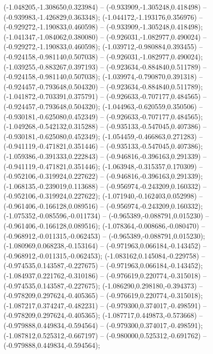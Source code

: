  (-1.048205,-1.308650,0.323984) -- (-0.933909,-1.305248,0.418498) -- (-0.939983,-1.426829,0.363348);
 (-1.044172,-1.193176,0.356976) -- (-0.929272,-1.190833,0.460598) -- (-0.933909,-1.305248,0.418498);
 (-1.041347,-1.084062,0.380080) -- (-0.926031,-1.082977,0.490024) -- (-0.929272,-1.190833,0.460598);
 (-1.039712,-0.980884,0.393455) -- (-0.924158,-0.981140,0.507038) -- (-0.926031,-1.082977,0.490024);
 (-1.039255,-0.883267,0.397193) -- (-0.923634,-0.884840,0.511789) -- (-0.924158,-0.981140,0.507038);
 (-1.039974,-0.790870,0.391318) -- (-0.924457,-0.793648,0.504320) -- (-0.923634,-0.884840,0.511789);
 (-1.041872,-0.703391,0.375791) -- (-0.926633,-0.707177,0.484565) -- (-0.924457,-0.793648,0.504320);
 (-1.044963,-0.620559,0.350506) -- (-0.930181,-0.625080,0.452349) -- (-0.926633,-0.707177,0.484565);
 (-1.049268,-0.542132,0.315288) -- (-0.935133,-0.547045,0.407386) -- (-0.930181,-0.625080,0.452349);
 (-1.054459,-0.466863,0.271283) -- (-0.941119,-0.471821,0.351446) -- (-0.935133,-0.547045,0.407386);
 (-1.059386,-0.391333,0.222843) -- (-0.946816,-0.396163,0.291339) -- (-0.941119,-0.471821,0.351446);
 (-1.063948,-0.315357,0.170309) -- (-0.952106,-0.319924,0.227622) -- (-0.946816,-0.396163,0.291339);
 (-1.068135,-0.239019,0.113688) -- (-0.956974,-0.243209,0.160332) -- (-0.952106,-0.319924,0.227622);
 (-1.071940,-0.162403,0.052998) -- (-0.961406,-0.166128,0.089516) -- (-0.956974,-0.243209,0.160332);
 (-1.075352,-0.085596,-0.011734) -- (-0.965389,-0.088791,0.015230) -- (-0.961406,-0.166128,0.089516);
 (-1.078364,-0.008686,-0.080470) -- (-0.968912,-0.011315,-0.062453) -- (-0.965389,-0.088791,0.015230);
 (-1.080969,0.068238,-0.153164) -- (-0.971963,0.066184,-0.143452) -- (-0.968912,-0.011315,-0.062453);
 (-1.083162,0.145084,-0.229758) -- (-0.974535,0.143587,-0.227675) -- (-0.971963,0.066184,-0.143452);
 (-1.084937,0.221762,-0.310186) -- (-0.976619,0.220774,-0.315018) -- (-0.974535,0.143587,-0.227675);
 (-1.086290,0.298180,-0.394373) -- (-0.978209,0.297624,-0.405365) -- (-0.976619,0.220774,-0.315018);
 (-1.087217,0.374247,-0.482231) -- (-0.979300,0.374017,-0.498591) -- (-0.978209,0.297624,-0.405365);
 (-1.087717,0.449873,-0.573668) -- (-0.979888,0.449834,-0.594564) -- (-0.979300,0.374017,-0.498591);
 (-1.087812,0.525312,-0.667197) -- (-0.980000,0.525312,-0.691762) -- (-0.979888,0.449834,-0.594564);

